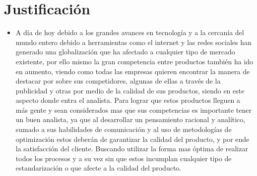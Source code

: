     \section{Justificación}
    
    \begin{itemize}
        \item A día de hoy debido a los grandes avances en tecnología y a la cercanía del mundo entero debido a herramientas como el internet y las redes sociales han generado una globalización que ha afectado a cualquier tipo de mercado existente, por ello mismo la gran competencia entre productos también ha ido en aumento, viendo como todas las empresas quieren encontrar la manera de destacar por sobre sus competidores, algunas de ellas a través de la publicidad y otras por medio de la calidad de sus productos, siendo en este aspecto donde entra el analista. Para lograr que estos productos lleguen a más gente y sean considerados mas que sus competencias es importante tener un buen analista, ya que al desarrollar un pensamiento racional y analítico, sumado a sus habilidades de comunicación y al uso de metodologías de optimización estos deberán de garantizar la calidad del producto, y por ende la satisfacción del cliente. Buscando utilizar la forma mas óptima de realizar todos los procesos y a su vez sin que estos incumplan cualquier tipo de estandarización o que afecte a la calidad del producto.\cite{Indeed}
    \end{itemize}
